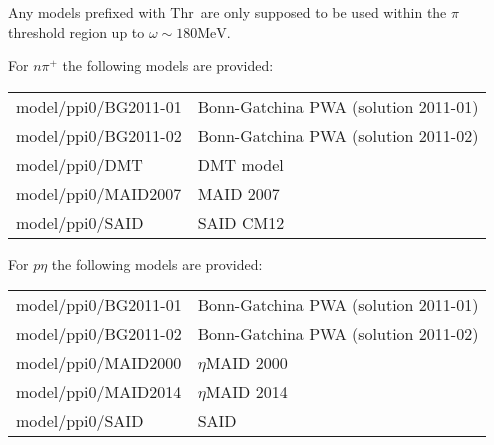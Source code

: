 \documentclass[a4paper,10pt]{article}
\def\bl{\phantom{0}}
\def\tt{\ttfamily}
\def\rm{\rmfamily}
\begin{document}
Any models prefixed with \tt Thr\rm\ are only supposed to be used within the $\pi$ threshold region up to
$\omega\sim 180\mathrm{MeV}$.

For $n \pi^+$ the following models are provided: \vspace{-0.25em}\\
\begin{tabular}{ll}
\hspace{-0.5em}\tt model/ppi0/BG2011-01\bl\rm & Bonn-Gatchina PWA (solution 2011-01) \cite{Model_BnGa} \vspace{-0.5em}\\
\hspace{-0.5em}\tt model/ppi0/BG2011-02\rm & Bonn-Gatchina PWA (solution 2011-02) \cite{Model_BnGa} \vspace{-0.5em}\\
\hspace{-0.5em}\tt model/ppi0/DMT\rm & DMT model \cite{Model_DMT} \vspace{-0.5em}\\
\hspace{-0.5em}\tt model/ppi0/MAID2007\rm & MAID 2007 \cite{Model_MAID} \vspace{-0.5em}\\
\hspace{-0.5em}\tt model/ppi0/SAID\rm & SAID CM12 \cite{Model_SAID} \vspace{-0.1em}\\
\end{tabular}

For $p \eta$ the following models are provided: \vspace{-0.25em}\\
\begin{tabular}{ll}
\hspace{-0.5em}\tt model/ppi0/BG2011-01\bl\rm & Bonn-Gatchina PWA (solution 2011-01) \cite{Model_BnGa} \vspace{-0.5em}\\
\hspace{-0.5em}\tt model/ppi0/BG2011-02\rm & Bonn-Gatchina PWA (solution 2011-02) \cite{Model_BnGa} \vspace{-0.5em}\\
\hspace{-0.5em}\tt model/ppi0/MAID2000\rm & $\eta$MAID 2000 \cite{Model_etaMAID} \vspace{-0.5em}\\
\hspace{-0.5em}\tt model/ppi0/MAID2014\rm & $\eta$MAID 2014 \vspace{-0.5em}\\
\hspace{-0.5em}\tt model/ppi0/SAID\rm & SAID \cite{Model_etaSAID} \vspace{-0.1em}\\
\end{tabular}
\end{document}

